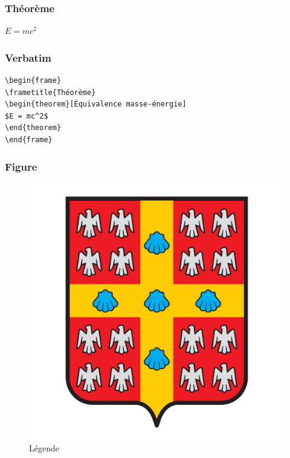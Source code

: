 \documentclass{beamer}
\begin{document}

\begin{frame}
\frametitle{Théorème}
\begin{theorem}
$E = mc^2$
\end{theorem}
\end{frame}


\begin{frame}[fragile]
\frametitle{Verbatim}
\begin{example} %
\begin{verbatim}
\begin{frame}
\frametitle{Théorème}
\begin{theorem}[Équivalence masse-énergie]
$E = mc^2$
\end{theorem}
\end{frame}\end{verbatim}
\end{example}
\end{frame}


\begin{frame}
\frametitle{Figure}
\begin{figure}
\includegraphics[scale=0.3]{ulaval.png}
\caption{Légende}
\end{figure}
\end{frame}
\end{document}
